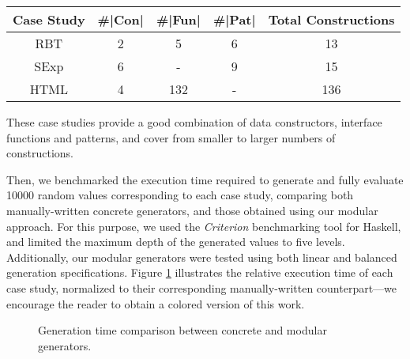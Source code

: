 \vspace{-5pt}
\begin{table}[H]
  \begin{tabular}{||c||c||c||c||c||}
    \hline
    Case Study & \#|Con| & \#|Fun| & \#|Pat| & Total Constructions \\ \hline
    \hline
    RBT        & 2       & 5       & 6       & 13                  \\ \hline
    SExp       & 6       & -       & 9       & 15                  \\ \hline
    HTML       & 4       & 132     & -       & 136                 \\ \hline
  \end{tabular}
\end{table}
\vspace{-5pt}

These case studies provide a good combination of data constructors, interface
functions and patterns, and cover from smaller to larger numbers of
constructions.


Then, we benchmarked the execution time required to generate and fully evaluate
10000 random values corresponding to each case study, comparing both
manually-written concrete generators, and those obtained using our modular
approach.
%
For this purpose, we used the \emph{Criterion} \cite{criterion} benchmarking
tool for Haskell, and limited the maximum depth of the generated values to five
levels.
%
Additionally, our modular generators were tested using both linear and balanced
generation specifications.
%
Figure \ref{fig:times} illustrates the relative execution time of each case
study, normalized to their corresponding manually-written counterpart---we
encourage the reader to obtain a colored version of this work.

\begin{figure}[t]
  \centering
  \vspace{-7pt}
  \caption{Generation time comparison between concrete and modular generators.}
  \label{fig:times}
  \vspace{-18pt}
\end{figure}

